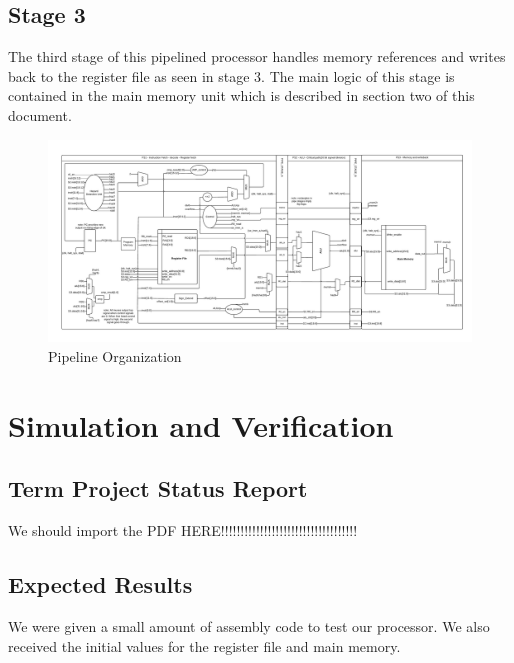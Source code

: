 	
    \subsection{Stage 3}
    The third stage of this pipelined processor handles memory references and writes back to the
    register file as seen in stage 3. The main logic of this stage is contained in the 
    main memory unit which is described in section two of this document.
    \FloatBarrier
    \newpage  
    \begin{figure}[htpb]
        \centering
        \includegraphics[angle=90,width=.68\textwidth]{./figures/142.pdf}
        \caption{Pipeline Organization}
        \label{fullschematic}
    \end{figure}
    \FloatBarrier


    \onecolumn

	\section{Simulation and Verification}
	\subsection{Term Project Status Report}
	We should import the PDF HERE!!!!!!!!!!!!!!!!!!!!!!!!!!!!!!!!!!!
	
	\subsection{Expected Results}
	We were given a small amount of assembly code to test our processor. We also
	received the initial values for the register file and main memory. 
	
	
